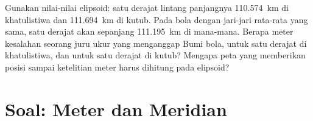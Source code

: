\begin{exercise}[$\star\star\star$]\label{exo:g10:measuring-the-earth:15}
Gunakan nilai-nilai elipsoid: satu derajat lintang panjangnya
\qty{110.574}{km} di khatulistiwa dan \qty{111.694}{km} di kutub. Pada bola
dengan jari-jari rata-rata yang sama, satu derajat akan sepanjang
\qty{111.195}{km} di mana-mana. Berapa meter kesalahan seorang juru ukur yang
menganggap Bumi bola, untuk satu derajat di khatulistiwa, dan untuk satu
derajat di kutub? Mengapa peta yang memberikan posisi sampai ketelitian meter
harus dihitung pada elipsoid?
\end{exercise}

\section{Soal: Meter dan Meridian}

